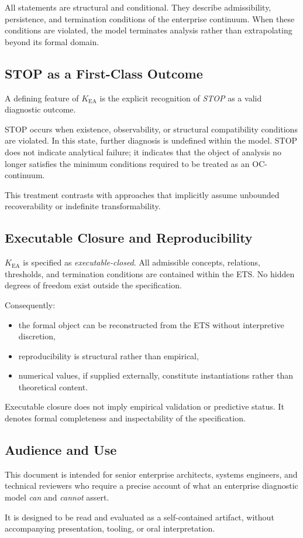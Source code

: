 All statements are structural and conditional.
They describe admissibility, persistence, and termination conditions of
the enterprise continuum.
When these conditions are violated, the model terminates analysis rather
than extrapolating beyond its formal domain.

\subsection*{STOP as a First-Class Outcome}

A defining feature of $K_{\mathrm{EA}}$ is the explicit recognition of
\emph{STOP} as a valid diagnostic outcome.

STOP occurs when existence, observability, or structural compatibility
conditions are violated.
In this state, further diagnosis is undefined within the model.
STOP does not indicate analytical failure; it indicates that the object
of analysis no longer satisfies the minimum conditions required to be
treated as an OC-continuum.

This treatment contrasts with approaches that implicitly assume
unbounded recoverability or indefinite transformability.

\subsection*{Executable Closure and Reproducibility}

$K_{\mathrm{EA}}$ is specified as \emph{executable-closed}.
All admissible concepts, relations, thresholds, and termination
conditions are contained within the ETS.
No hidden degrees of freedom exist outside the specification.

Consequently:
\begin{itemize}
  \item the formal object can be reconstructed from the ETS without
        interpretive discretion,
  \item reproducibility is structural rather than empirical,
  \item numerical values, if supplied externally, constitute
        instantiations rather than theoretical content.
\end{itemize}

Executable closure does not imply empirical validation or predictive
status.
It denotes formal completeness and inspectability of the specification.

\subsection*{Audience and Use}

This document is intended for senior enterprise architects, systems
engineers, and technical reviewers who require a precise account of what
an enterprise diagnostic model \emph{can} and \emph{cannot} assert.

It is designed to be read and evaluated as a self-contained artifact,
without accompanying presentation, tooling, or oral interpretation.

